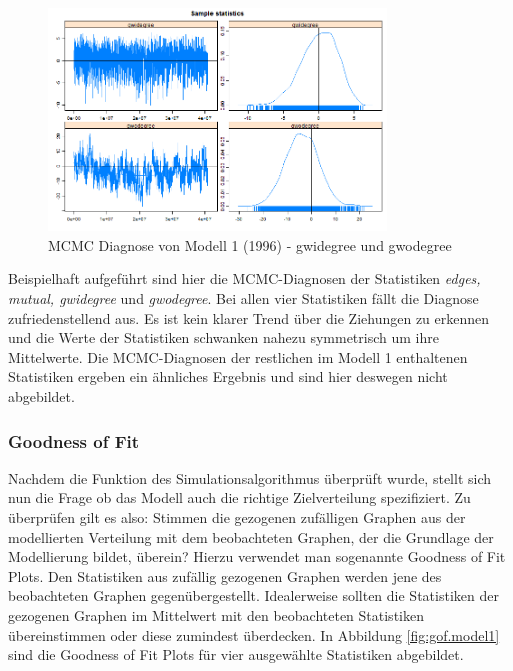 \documentclass[a4paper,ngerman,oneside,titlepage,bibliography=totoc,11pt]{scrreprt}
\begin{document}
	\begin{figure}[h]
	\centering
		\includegraphics[width=0.8\textwidth]{Grafiken/mcmc_diag2.png}
	\caption{MCMC Diagnose von Modell 1 (1996) - gwidegree und gwodegree}
	\end{figure}
Beispielhaft aufgeführt sind hier die MCMC-Diagnosen der Statistiken \emph{edges, mutual, gwidegree} und \emph{gwodegree}. Bei allen vier Statistiken fällt die Diagnose zufriedenstellend aus. Es ist kein klarer Trend über die Ziehungen zu erkennen und die Werte der Statistiken schwanken nahezu symmetrisch um ihre Mittelwerte. Die MCMC-Diagnosen der restlichen im Modell 1 enthaltenen Statistiken ergeben ein ähnliches Ergebnis und sind hier deswegen nicht abgebildet.

\subsubsection{Goodness of Fit}
Nachdem die Funktion des Simulationsalgorithmus überprüft wurde, stellt sich nun die Frage ob das Modell auch die richtige Zielverteilung spezifiziert. Zu überprüfen gilt es also: Stimmen die gezogenen zufälligen Graphen aus der modellierten Verteilung mit dem beobachteten Graphen, der die Grundlage der Modellierung bildet, überein? Hierzu verwendet man sogenannte Goodness of Fit Plots. Den Statistiken aus zufällig gezogenen Graphen werden jene des beobachteten Graphen gegenübergestellt. Idealerweise sollten die Statistiken der gezogenen Graphen im Mittelwert mit den beobachteten Statistiken übereinstimmen oder diese zumindest überdecken. In Abbildung \ref{fig:gof.model1} sind die Goodness of Fit Plots für vier ausgewählte Statistiken abgebildet.
\end{document}
